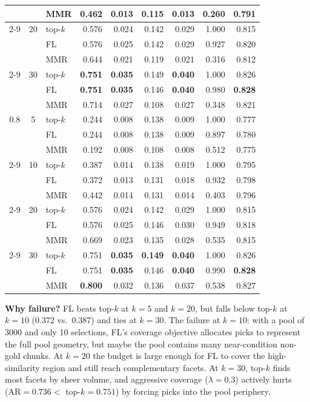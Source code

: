 \documentclass[11pt,a4paper]{article}
\begin{document}
\begin{longtable}{@{}cclrrrrrr@{}}
	&    & MMR     & 0.462 & 0.013 & 0.115 & 0.013 & 0.260 & 0.791 \\
	\cmidrule(l){2-9}
	& 20 & top-$k$ & 0.576 & 0.024 & 0.142 & 0.029 & 1.000 & 0.815 \\
	&    & FL      & 0.576 & 0.025 & 0.142 & 0.029 & 0.927 & 0.820 \\
	&    & MMR     & 0.644 & 0.021 & 0.119 & 0.021 & 0.316 & 0.812 \\
	\cmidrule(l){2-9}
	& 30 & top-$k$ & \textbf{0.751} & \textbf{0.035} & 0.149 & \textbf{0.040} & 1.000 & 0.826 \\
	&    & FL      & \textbf{0.751} & \textbf{0.035} & 0.146 & \textbf{0.040} & 0.980 & \textbf{0.828} \\
	&    & MMR     & 0.714 & 0.027 & 0.108 & 0.027 & 0.348 & 0.821 \\
	\midrule
	0.8 & 5  & top-$k$ & 0.244 & 0.008 & 0.138 & 0.009 & 1.000 & 0.777 \\
	&    & FL      & 0.244 & 0.008 & 0.138 & 0.009 & 0.897 & 0.780 \\
	&    & MMR     & 0.192 & 0.008 & 0.108 & 0.008 & 0.512 & 0.775 \\
	\cmidrule(l){2-9}
	& 10 & top-$k$ & 0.387 & 0.014 & 0.138 & 0.019 & 1.000 & 0.795 \\
	&    & FL      & 0.372 & 0.013 & 0.131 & 0.018 & 0.932 & 0.798 \\
	&    & MMR     & 0.442 & 0.014 & 0.131 & 0.014 & 0.403 & 0.796 \\
	\cmidrule(l){2-9}
	& 20 & top-$k$ & 0.576 & 0.024 & 0.142 & 0.029 & 1.000 & 0.815 \\
	&    & FL      & 0.576 & 0.025 & 0.146 & 0.030 & 0.949 & 0.818 \\
	&    & MMR     & 0.669 & 0.023 & 0.135 & 0.028 & 0.535 & 0.815 \\
	\cmidrule(l){2-9}
	& 30 & top-$k$ & 0.751 & \textbf{0.035} & \textbf{0.149} & \textbf{0.040} & 1.000 & 0.826 \\
	&    & FL      & 0.751 & \textbf{0.035} & 0.146 & \textbf{0.040} & 0.990 & \textbf{0.828} \\
	&    & MMR     & \textbf{0.800} & 0.032 & 0.136 & 0.037 & 0.538 & 0.827 \\
\end{longtable}

\textbf{Why failure?} FL beats top-$k$ at $k=5$ and $k=20$, but falls below top-$k$ at $k=10$ (0.372 vs.\ 0.387) and ties at $k=30$. The failure at $k=10$: with a pool of 3000 and only 10 selections, FL's coverage objective allocates picks to represent the full pool geometry, but maybe the pool contains many near-condition non-gold chunks. At $k=20$ the budget is large enough for FL to cover the high-similarity region and still reach complementary facets. At $k=30$, top-$k$ finds most facets by sheer volume, and aggressive coverage ($\lambda=0.3$) actively hurts (AR$=0.736 <$ top-$k=0.751$) by forcing picks into the pool periphery.
\end{document}
